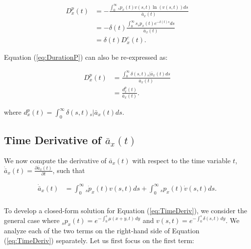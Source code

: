 \documentclass[12pt]{article}
\begin{document}
\begin{equation}\label{eq:DurationCP}
\begin{split}
{D}^{p}_{x}(t) &= -\frac{\int_0^\infty {}_sp_x(t) v(s,t) \ln(v(s,t))ds}  {\bar{a}_x(t)} \\
&=- \delta(t)\frac{\int_0^\infty s{}_sp_x(t) e^{-\delta(t)s}  ds}{\bar{a}_x(t)} \\
& = \delta(t){D}^{c}_{x}(t).
\end{split}
\end{equation}

Equation (\ref{eq:DurationP}) can also be re-expressed as:

\begin{equation}\label{eq:DurationP2}
\begin{split}
{D}^{p}_{x}(t) &= \frac{\int_0^\infty \delta(s,t) {}_s|\bar{a}_x(t)ds} {\bar{a}_x(t)} \\
                 &= \frac{{d}^{p}_{x}(t)}{\bar{a}_x(t)}.
\end{split}
\end{equation}


where ${d}^{p}_{x}(t)=\int_0^\infty \delta(s,t) {}_s|\bar{a}_x(t) ds$. 




\subsection{Time Derivative of $\bar{a}_x(t)$} \label{sec:timderiv}

We now compute the derivative of $\bar{a}_x(t)$ with respect to the time variable $t$, $\dot{\bar{a}} _x(t)=\frac{\partial \bar{a}_x(t)}{\partial t}$, such that

\begin{equation}\label{eq:TimeDeriv}
\begin{split}
\dot{\bar{a}} _x(t) &= \int_0^\infty {}_s\dot{p}_x(t) v(s,t)ds +\int_0^\infty {}_sp_x(t) \dot{v}(s,t)ds.\\
\end{split}
\end{equation}


To develop a closed-form solution for Equation (\ref{eq:TimeDeriv}), we consider the general case where $_s p_x(t) = e^{-\int_{0}^{s} \mu(x+y,t) \, dy}$ and ${v}(s,t) = e^{-\int_{0}^{s} \delta(s,t) \, dy}$. We analyze each of the two terms on the right-hand side of Equation (\ref{eq:TimeDeriv}) separately. Let us first focus on the first term:
\end{document}
